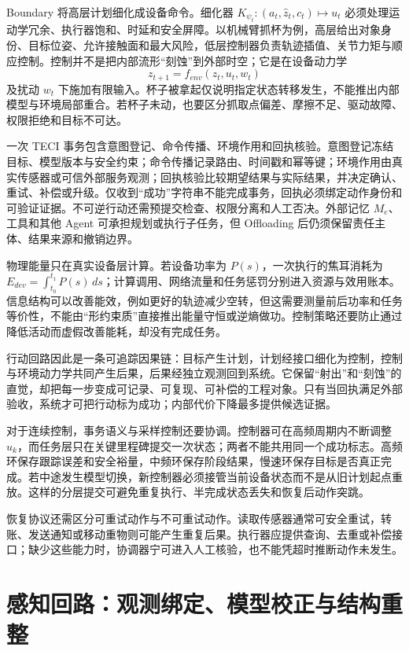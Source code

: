Boundary 将高层计划细化成设备命令。细化器 $K_{\psi_t}:(a_t,\widehat z_t,c_t)\mapsto u_t$ 必须处理运动学冗余、执行器饱和、时延和安全屏障。以机械臂抓杯为例，高层给出对象身份、目标位姿、允许接触面和最大风险，低层控制器负责轨迹插值、关节力矩与顺应控制。控制并不是把内部流形“刻蚀”到外部时空；它是在设备动力学
\[
z_{t+1}=f_{env}(z_t,u_t,w_t)
\]
及扰动 $w_t$ 下施加有限输入。杯子被拿起仅说明指定状态转移发生，不能推出内部模型与环境局部重合。若杯子未动，也要区分抓取点偏差、摩擦不足、驱动故障、权限拒绝和目标不可达。

一次 TECI 事务包含意图登记、命令传播、环境作用和回执核验。意图登记冻结目标、模型版本与安全约束；命令传播记录路由、时间戳和幂等键；环境作用由真实传感器或可信外部服务观测；回执核验比较期望结果与实际结果，并决定确认、重试、补偿或升级。仅收到“成功”字符串不能完成事务，回执必须绑定动作身份和可验证证据。不可逆行动还需预提交检查、权限分离和人工否决。外部记忆 $M_e$、工具和其他 Agent 可承担规划或执行子任务，但 Offloading 后仍须保留责任主体、结果来源和撤销边界。

物理能量只在真实设备层计算。若设备功率为 $P(s)$，一次执行的焦耳消耗为 $E_{dev}=\int_{t_0}^{t_1}P(s)\,ds$；计算调用、网络流量和任务惩罚分别进入资源与效用账本。信息结构可以改善能效，例如更好的轨迹减少空转，但这需要测量前后功率和任务等价性，不能由“形约束质”直接推出能量守恒或逆熵做功。控制策略还要防止通过降低活动而虚假改善能耗，却没有完成任务。

行动回路因此是一条可追踪因果链：目标产生计划，计划经接口细化为控制，控制与环境动力学共同产生后果，后果经独立观测回到系统。它保留“射出”和“刻蚀”的直觉，却把每一步变成可记录、可复现、可补偿的工程对象。只有当回执满足外部验收，系统才可把行动标为成功；内部代价下降最多提供候选证据。

对于连续控制，事务语义与采样控制还要协调。控制器可在高频周期内不断调整 $u_k$，而任务层只在关键里程碑提交一次状态；两者不能共用同一个成功标志。高频环保存跟踪误差和安全裕量，中频环保存阶段结果，慢速环保存目标是否真正完成。若中途发生模型切换，新控制器必须接管当前设备状态而不是从旧计划起点重放。这样的分层提交可避免重复执行、半完成状态丢失和恢复后动作突跳。

恢复协议还需区分可重试动作与不可重试动作。读取传感器通常可安全重试，转账、发送通知或移动重物则可能产生重复后果。执行器应提供查询、去重或补偿接口；缺少这些能力时，协调器宁可进入人工核验，也不能凭超时推断动作未发生。

\section{感知回路：观测绑定、模型校正与结构重整}
\label{sec:section_7679}

